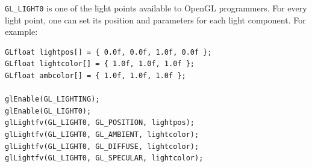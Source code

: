 \texttt{GL\_LIGHT0} is one of the light points available to 
OpenGL programmers. For every light point, one can set its 
position and parameters for each light component. For example:
\\
\begin{lstlisting}[caption={Complex lighting example}, label={code:complexlighting}]
GLfloat lightpos[] = { 0.0f, 0.0f, 1.0f, 0.0f };
GLfloat lightcolor[] = { 1.0f, 1.0f, 1.0f };
GLfloat ambcolor[] = { 1.0f, 1.0f, 1.0f };

glEnable(GL_LIGHTING);
glEnable(GL_LIGHT0);                        
glLightfv(GL_LIGHT0, GL_POSITION, lightpos);
glLightfv(GL_LIGHT0, GL_AMBIENT, lightcolor);
glLightfv(GL_LIGHT0, GL_DIFFUSE, lightcolor);
glLightfv(GL_LIGHT0, GL_SPECULAR, lightcolor);
\end{lstlisting}
